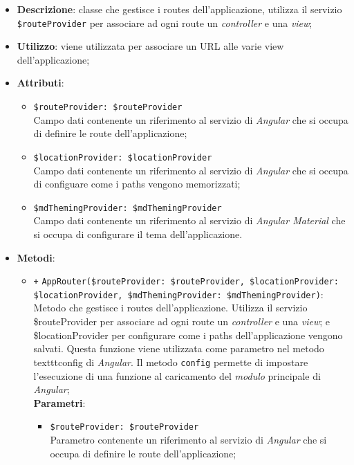 	\begin{itemize}
		\item \textbf{Descrizione}: classe che gestisce i routes dell’applicazione, utilizza il servizio \texttt{\$routeProvider} per associare ad ogni route un \textit{controller} e una \textit{view};
		\item \textbf{Utilizzo}: viene utilizzata per associare un URL alle varie view dell'applicazione;
		\item \textbf{Attributi}:
		\begin{itemize}
			\item \texttt{\$routeProvider: \$routeProvider}\\ Campo dati contenente un riferimento al servizio di \textit{Angular} che si occupa di definire le route dell'applicazione;
			\item \texttt{\$locationProvider: \$locationProvider}\\ Campo dati contenente un riferimento al servizio di \textit{Angular} che si occupa di configuare come i paths vengono memorizzati;
			\item \texttt{\$mdThemingProvider: \$mdThemingProvider}\\ Campo dati contenente un riferimento al servizio di \textit{Angular Material} che si occupa di configurare il tema dell'applicazione.
		\end{itemize}
		\item \textbf{Metodi}: 
		\begin{itemize}
			\item \texttt{+} \texttt{AppRouter(\$routeProvider: \$routeProvider, \$locationProvider:\\ \$locationProvider, \$mdThemingProvider: \$mdThemingProvider)}: \\ Metodo che gestisce i routes dell'applicazione. Utilizza il servizio \$routeProvider per associare ad ogni route un \textit{controller} e una \textit{view}; e \$locationProvider per configurare come i paths dell'applicazione vengono salvati. Questa funzione viene utilizzata come parametro nel metodo texttt{config} di \textit{Angular}. Il metodo \texttt{config} permette di impostare l'esecuzione di una funzione al caricamento del \textit{modulo} principale di \textit{Angular};\\
			\textbf{Parametri}:
			\begin{itemize}
				\item \texttt{\$routeProvider: \$routeProvider}\\ Parametro contenente un riferimento al servizio di \textit{Angular} che si occupa di definire le route dell'applicazione;

\end{itemize}
\end{itemize}
\end{itemize}
